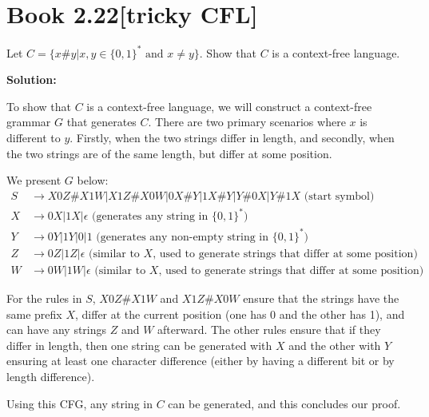 \documentclass[11pt]{article}
\newenvironment{question}[2]
{\newpage\section{#1\texorpdfstring{\hfill}{horizontal spacing}{\rm\normalsize #2}}}{}
\newenvironment{solution}
{\textbf{Solution: }\color{blue}}
{\color{black}}
\begin{document}

\begin{question}{Book 2.22}{[tricky CFL]}

Let \(C= \{ x\#y | x,y \in \{ 0,1 \}^* \text{ and } x \neq y \}\). Show that \(C\) is a context-free language.

\begin{solution}

To show that \(C\) is a context-free language, we will construct a context-free grammar \(G\) that generates \(C\). There are two primary scenarios where \(x\) is different to \(y\). Firstly, when the two strings differ in length, and secondly, when the two strings are of the same length, but differ at some position.

We present \(G\) below:
\begin{equation*}
    \begin{split}
        S &\rightarrow X0Z \# X1W | X1Z \# X0W | 0X \# Y | 1X \# Y | Y \# 0X | Y \# 1X \text{ (start symbol)} \\
        X &\rightarrow 0X | 1X | \epsilon \text{ (generates any string in \(\{0,1\}^*\))} \\
        Y &\rightarrow 0Y | 1Y | 0 | 1 \text{ (generates any non-empty string in \(\{0,1\}^*\))} \\
        Z &\rightarrow 0Z | 1Z | \epsilon \text{ (similar to \(X\), used to generate strings that differ at some position)} \\
        W &\rightarrow 0W | 1W | \epsilon \text{ (similar to \(X\), used to generate strings that differ at some position)}
    \end{split}
\end{equation*}

For the rules in \(S\), \(X0Z \# X1W\) and \(X1Z \# X0W\) ensure that the strings have the same prefix \(X\), differ at the current position (one has 0 and the other has 1), and can have any strings \(Z\) and \(W\) afterward. The other rules ensure that if they differ in length, then one string can be generated with \(X\) and the other with \(Y\) ensuring at least one character difference (either by having a different bit or by length difference).

Using this CFG, any string in \(C\) can be generated, and this concludes our proof.

\end{solution}
\end{question}
\end{document}
